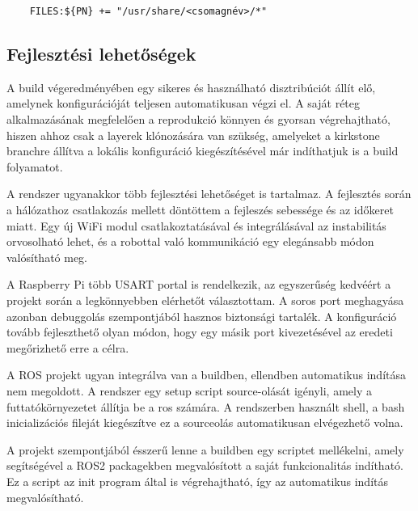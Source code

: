\begin{verbatim}
    FILES:${PN} += "/usr/share/<csomagnév>/*"
\end{verbatim}

\subsection{Fejlesztési lehetőségek}

A build végeredményében egy sikeres és használható disztribúciót állít elő,
amelynek konfigurációját teljesen automatikusan végzi el. A saját réteg
alkalmazásának megfelelően a reprodukció könnyen és gyorsan végrehajtható, hiszen
ahhoz csak a layerek klónozására van szükség, amelyeket a kirkstone branchre
állítva a lokális konfiguráció kiegészítésével már indíthatjuk is a build
folyamatot. 

A rendszer ugyanakkor több fejlesztési lehetőséget is tartalmaz. A fejlesztés
során a hálózathoz csatlakozás mellett döntöttem a fejleszés sebessége és az
időkeret miatt. Egy új WiFi modul csatlakoztatásával és integrálásával az
instabilitás orvosolható lehet, és a robottal való kommunikáció egy elegánsabb
módon valósítható meg. 

A Raspberry Pi több USART portal is rendelkezik, az egyszerűség kedvéért a
projekt során a legkönnyebben elérhetőt választottam. A soros port meghagyása
azonban debuggolás szempontjából hasznos biztonsági tartalék. A konfiguráció
tovább fejleszthető olyan módon, hogy egy másik port kivezetésével az eredeti
megőrizhető erre a célra.

A ROS projekt ugyan integrálva van a buildben, ellendben automatikus indítása nem
megoldott. A rendszer egy setup script source-olását igényli, amely a
futtatókörnyezetet állítja be a ros számára. A rendszerben használt shell, a bash
inicializációs fileját kiegészítve ez a sourceolás automatikusan elvégezhető
volna.

A projekt szempontjából ésszerű lenne a buildben egy scriptet mellékelni, amely
segítségével a ROS2 packagekben megvalósított a saját funkcionalitás
indítható. Ez a script az init program által is végrehajtható, így az automatikus
indítás megvalósítható.

